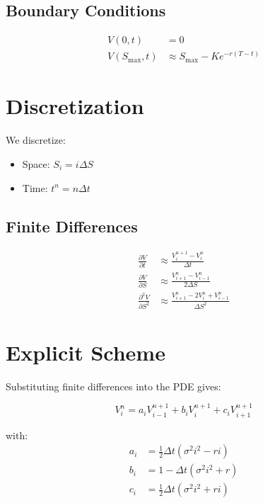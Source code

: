\documentclass[11pt]{article}
\begin{document}
\subsection{Boundary Conditions}

\begin{align}
V(0, t) &= 0 \\
V(S_{\max}, t) &\approx S_{\max} - K e^{-r(T-t)}
\end{align}

\section{Discretization}

We discretize:
\begin{itemize}
    \item Space: $S_i = i \Delta S$
    \item Time: $t^n = n \Delta t$
\end{itemize}

\subsection{Finite Differences}

\begin{align}
\frac{\partial V}{\partial t} &\approx \frac{V_i^{n+1} - V_i^n}{\Delta t} \\
\frac{\partial V}{\partial S} &\approx \frac{V_{i+1}^n - V_{i-1}^n}{2\Delta S} \\
\frac{\partial^2 V}{\partial S^2} &\approx \frac{V_{i+1}^n - 2V_i^n + V_{i-1}^n}{\Delta S^2}
\end{align}

\section{Explicit Scheme}

Substituting finite differences into the PDE gives:

\begin{equation}
V_i^n = a_i V_{i-1}^{n+1} + b_i V_i^{n+1} + c_i V_{i+1}^{n+1}
\end{equation}

with:
\begin{align}
a_i &= \frac{1}{2} \Delta t (\sigma^2 i^2 - r i) \\
b_i &= 1 - \Delta t (\sigma^2 i^2 + r) \\
c_i &= \frac{1}{2} \Delta t (\sigma^2 i^2 + r i)
\end{align}
\end{document}

